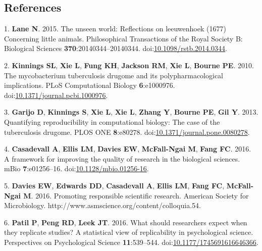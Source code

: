 \documentclass[]{article}
\begin{document}
\newpage

\subsection*{References}\label{references}

\hypertarget{refs}{}
\hypertarget{ref-Lane2015}{}
1. \textbf{Lane N}. 2015. The unseen world: Reflections on leeuwenhoek
(1677) Concerning little animals. Philosophical Transactions of the
Royal Society B: Biological Sciences \textbf{370}:20140344--20140344.
doi:\href{https://doi.org/10.1098/rstb.2014.0344}{10.1098/rstb.2014.0344}.

\hypertarget{ref-Kinnings2010}{}
2. \textbf{Kinnings SL}, \textbf{Xie L}, \textbf{Fung KH},
\textbf{Jackson RM}, \textbf{Xie L}, \textbf{Bourne PE}. 2010. The
mycobacterium tuberculosis drugome and its polypharmacological
implications. PLoS Computational Biology \textbf{6}:e1000976.
doi:\href{https://doi.org/10.1371/journal.pcbi.1000976}{10.1371/journal.pcbi.1000976}.

\hypertarget{ref-Garijo2013}{}
3. \textbf{Garijo D}, \textbf{Kinnings S}, \textbf{Xie L}, \textbf{Xie
L}, \textbf{Zhang Y}, \textbf{Bourne PE}, \textbf{Gil Y}. 2013.
Quantifying reproducibility in computational biology: The case of the
tuberculosis drugome. PLOS ONE \textbf{8}:e80278.
doi:\href{https://doi.org/10.1371/journal.pone.0080278}{10.1371/journal.pone.0080278}.

\hypertarget{ref-Casadevall2016}{}
4. \textbf{Casadevall A}, \textbf{Ellis LM}, \textbf{Davies EW},
\textbf{McFall-Ngai M}, \textbf{Fang FC}. 2016. A framework for
improving the quality of research in the biological sciences. mBio
\textbf{7}:e01256--16.
doi:\href{https://doi.org/10.1128/mbio.01256-16}{10.1128/mbio.01256-16}.

\hypertarget{ref-Davies2016}{}
5. \textbf{Davies EW}, \textbf{Edwards DD}, \textbf{Casadevall A},
\textbf{Ellis LM}, \textbf{Fang FC}, \textbf{McFall-Ngai M}. 2016.
Promoting responsible scientific research. American Society for
Microbiology. http://www.asmscience.org/content/colloquia.54.

\hypertarget{ref-Patil2016}{}
6. \textbf{Patil P}, \textbf{Peng RD}, \textbf{Leek JT}. 2016. What
should researchers expect when they replicate studies? A statistical
view of replicability in psychological science. Perspectives on
Psychological Science \textbf{11}:539--544.
doi:\href{https://doi.org/10.1177/1745691616646366}{10.1177/1745691616646366}.
\end{document}
